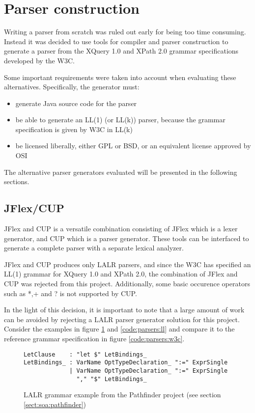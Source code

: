 \section{Parser construction}
\label{sect:method:alternatives}
Writing a parser from scratch was ruled out early for being too time consuming.
Instead it was decided to use tools for compiler and parser construction to
generate a parser from the XQuery 1.0 and XPath 2.0 grammar  
specifications\cite{w3c01} developed by the W3C.

Some important requirements were taken into account when evaluating these
alternatives. Specifically, the generator must:
\begin{itemize}
  \item generate Java source code for the parser
  \item be able to generate an LL(1) (or LL(k)) parser, because the grammar  
  specification is given by W3C in LL(k)
  \item be licensed liberally, either GPL or BSD, or an equivalent license
  approved by OSI
\end{itemize}

The alternative parser generators evaluated will be presented in the following sections.

\subsection{JFlex/CUP}
JFlex and CUP is a versatile combination consisting of JFlex which is a lexer
generator, and CUP which is a parser generator. These tools can be interfaced to
generate a complete parser with a separate lexical analyzer.

JFlex and CUP produces only LALR parsers, and since the W3C has specified an
LL(1) grammar for XQuery 1.0 and XPath 2.0, the combination of JFlex and CUP was
rejected from this project. Additionally, some basic occurence operators such as
*,+ and ? is not supported by CUP.

In the light of this decision, it is important to note that a large amount of
work can be avoided by rejecting a LALR parser generator solution for this
project. Consider the examples in figure \ref{code:parsers:lalr} and
\ref{code:parsers:ll} and compare it to the reference grammar specification in
figure \ref{code:parsers:w3c}.


\begin{figure}[h!]
\begin{Verbatim}
LetClause    : "let $" LetBindings_
LetBindings_ : VarName OptTypeDeclaration_ ":=" ExprSingle
             | VarName OptTypeDeclaration_ ":=" ExprSingle
               "," "$" LetBindings_
\end{Verbatim}
\caption[LALR grammar example]{LALR grammar example from the Pathfinder project
(see section \ref{sect:soa:pathfinder})}
\label{code:parsers:lalr}
\end{figure}

